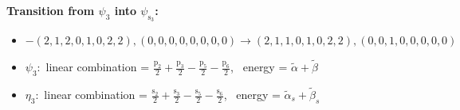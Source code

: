 \documentclass[12pt,a4paper]{article}
\begin{document}
        \noindent\textbf{Transition from $\psi_{3}$ into $\psi_{\text{s}_{3}}$:}
        \begin{itemize}
            \item $- (2, 1, 2, 0, 1, 0, 2, 2), (0, 0, 0, 0, 0, 0, 0, 0) \rightarrow (2, 1, 1, 0, 1, 0, 2, 2), (0, 0, 1, 0, 0, 0, 0, 0)$
        
            \item $\psi_{3}:$ linear combination = $\frac{\text{p}_{2}}{2} + \frac{\text{p}_{3}}{2} - \frac{\text{p}_{5}}{2} - \frac{\text{p}_{6}}{2}$, \
            energy = $\tilde{\alpha} + \tilde{\beta}$
            
            \item $\eta_{3}:$ linear combination = $\frac{\text{s}_{2}}{2} + \frac{\text{s}_{3}}{2} - \frac{\text{s}_{5}}{2} - \frac{\text{s}_{6}}{2}$, \
            energy = $\tilde{\alpha}_{s} + \tilde{\beta}_{s}$
            

\end{itemize}
\end{document}
